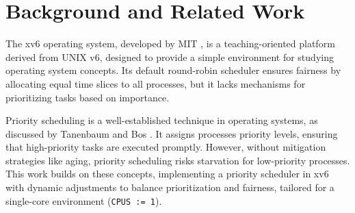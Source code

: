 \documentclass{article}
\begin{document}
\section{Background and Related Work}
The xv6 operating system, developed by MIT \cite{xv6}, is a teaching-oriented platform derived from UNIX v6, designed to provide a simple environment for studying operating system concepts. Its default round-robin scheduler ensures fairness by allocating equal time slices to all processes, but it lacks mechanisms for prioritizing tasks based on importance.

Priority scheduling is a well-established technique in operating systems, as discussed by Tanenbaum and Bos \cite{tanenbaum2008modern}. It assigns processes priority levels, ensuring that high-priority tasks are executed promptly. However, without mitigation strategies like aging, priority scheduling risks starvation for low-priority processes. This work builds on these concepts, implementing a priority scheduler in xv6 with dynamic adjustments to balance prioritization and fairness, tailored for a single-core environment (\texttt{CPUS := 1}).
\end{document}
